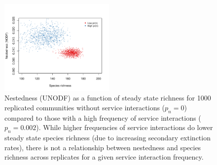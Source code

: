 \documentclass[onecolumn,preprintnumbers,amsmath,amssymb,superscriptaddress]{revtex4-1}
\begin{document}
\begin{bibunit}
% 


\begin{figure}[h!]
\centering
\includegraphics[width=0.5\textwidth]{fig_nestedvsize.pdf}
\caption{
Nestedness (UNODF) as a function of steady state richness for 1000 replicated communities without service interactions ($p_n = 0$) compared to those with a high frequency of service interactions ($p_n = 0.002$).
While higher frequencies of service interactions do lower steady state species richness (due to increasing secondary extinction rates), there is not a relationship between nestedness and species richness across replicates for a given service interaction frequency.
}
\label{fig:nestsize}
\end{figure}





\end{bibunit}
\end{document}
